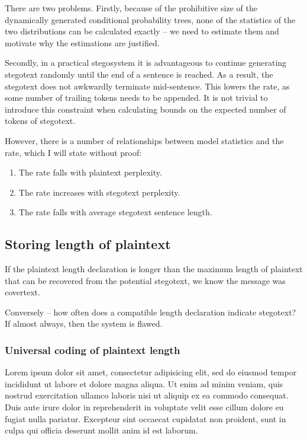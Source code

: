 \documentclass[draft]{IIBproject}
\begin{document}
There are two problems. Firstly, because of the prohibitive size of the dynamically generated conditional probability trees, none of the statistics of the two distributions can be calculated exactly -- we need to estimate them and motivate why the estimations are justified.

Secondly, in a practical stegosystem it is advantageous to continue generating stegotext randomly until the end of a sentence is reached. As a result, the stegotext does not awkwardly terminate mid-sentence. This lowers the rate, as some number of trailing tokens needs to be appended. It is not trivial to introduce this constraint when calculating bounds on the expected number of tokens of stegotext.

However, there is a number of relationships between model statistics and the rate, which I will state without proof:

\begin{enumerate}
\item The rate falls with plaintext perplexity.
\item The rate increases with stegotext perplexity.
\item The rate falls with average stegotext sentence length.
\end{enumerate}

\subsection{Storing length of plaintext}

If the plaintext length declaration is longer than the maximum length of plaintext that can be recovered from the potential stegotext, we know the message was covertext.

Conversely -- how often does a compatible length declaration indicate stegotext? If almost always, then the system is flawed.

\subsubsection{Universal coding of plaintext length}

Lorem ipsum dolor sit amet, consectetur adipisicing elit, sed do eiusmod tempor incididunt ut labore et dolore magna aliqua. Ut enim ad minim veniam, quis nostrud exercitation ullamco laboris nisi ut aliquip ex ea commodo consequat. Duis aute irure dolor in reprehenderit in voluptate velit esse cillum dolore eu fugiat nulla pariatur. Excepteur sint occaecat cupidatat non proident, sunt in culpa qui officia deserunt mollit anim id est laborum.
\end{document}
